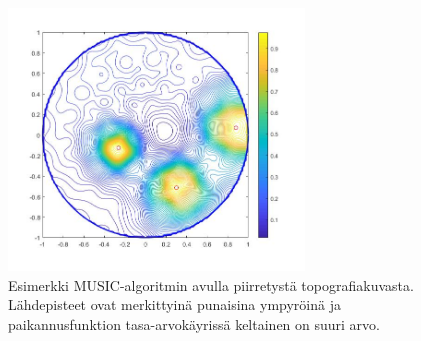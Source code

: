 \clearpage
\begin{figure}[ht]
    \centering
    \includegraphics[width=0.7\textwidth]{esim3.jpg}
    \caption{Esimerkki MUSIC-algoritmin avulla piirretystä topografiakuvasta. Lähdepisteet ovat merkittyinä punaisina ympyröinä ja paikannusfunktion tasa-arvokäyrissä keltainen on suuri arvo.}
    \label{fig:esim}
\end{figure}